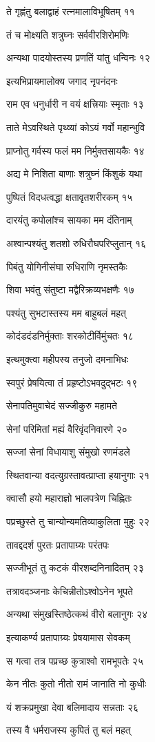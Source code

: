 ते गृह्णंतु बलाद्वाहं रत्नमालाविभूषितम् ११

तं च मोक्ष्यति शत्रुघ्नः सर्ववीरशिरोमणिः

अन्यथा पादयोस्तस्य प्रणतिं यांतु धन्विनः १२

इत्यभिप्रायमालोक्य जगाद नृपनंदनः

राम एव धनुर्धारी न वयं क्षत्त्रियाः स्मृताः १३

ताते मेऽवस्थिते पृथ्व्यां कोऽयं गर्वो महान्भुवि

प्राप्नोतु गर्वस्य फलं मम निर्मुक्तसायकैः १४

अद्य मे निशिता बाणाः शत्रुघ्नं किंशुकं यथा

पुष्पितं विदधत्वद्धा क्षतावृतशरीरकम् १५

दारयंतु कपोलांश्च सायका मम दंतिनाम्

अश्वान्पश्यंतु शतशो रुधिरौघपरिप्लुतान् १६

पिबंतु योगिनीसंघा रुधिराणि नृमस्तकैः

शिवा भवंतु संतुष्टा मद्वैरिक्रव्यभक्षणैः १७

पश्यंतु सुभटास्तस्य मम बाहुबलं महत्

कोदंडदंडनिर्मुक्ताः शरकोटीर्विमुंचतः १८

इत्थमुक्त्वा महीपस्य तनुजो दमनाभिधः

स्वपुरं प्रेषयित्वा तं प्रहृष्टोऽभवदुद्भटः १९

सेनापतिमुवाचेदं सज्जीकुरु महामते

सेनां परिमितां मह्यं वैरिवृंदनिवारणे २०

सज्जां सेनां विधायाशु संमुखो रणमंडले

स्थितवान्या वदत्युग्रस्तावत्प्राप्ता हयानुगाः २१

क्वासौ हयो महाराज्ञो भालपत्रेण चिह्नितः

पप्रच्छुस्ते तु चान्योन्यमतिव्याकुलिता मुहुः २२

तावद्ददर्श पुरतः प्रतापाग्र्यः परंतपः

सज्जीभूतं तु कटकं वीरशब्दनिनादितम् २३

तत्रावदञ्जनाः केचिन्नीतोऽश्वोऽनेन भूपते

अन्यथा संमुखस्तिष्ठेत्कथं वीरो बलानुगः २४

इत्याकर्ण्य प्रतापाग्र्यः प्रेषयामास सेवकम्

स गत्वा तत्र पप्रच्छ कुत्राश्वो रामभूपतेः २५

केन नीतः कुतो नीतो रामं जानाति नो कुधीः

यं शक्रप्रमुखा देवा बलिमादाय सन्नताः २६

तस्य वै धर्मराजस्य कुपितं तु बलं महत्


